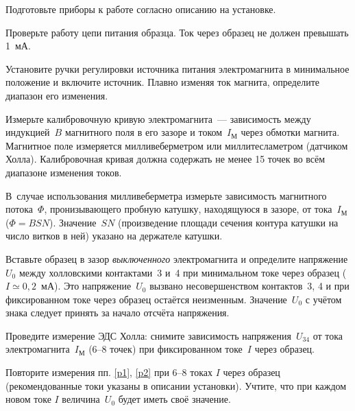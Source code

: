 \begin{lab:task}


\item Подготовьте приборы к работе согласно описанию на установке.

\item Проверьте работу цепи питания образца. Ток через образец не должен
превышать 1~мА.

\item Установите ручки регулировки источника питания электромагнита 
в минимальное положение и включите источник. 
Плавно изменяя ток магнита, определите диапазон его изменения.

\item Измерьте калибровочную кривую электромагнита~---
зависимость между индукцией~$B$ магнитного поля в его зазоре и 
током~$I_{М}$ через обмотки магнита.
Магнитное поле измеряется милливеберметром или миллитесламетром
(датчиком Холла). Калибровочная кривая должна содержать не менее
15 точек во всём диапазоне изменения токов.

В~случае использования милливеберметра измерьте зависимость 
магнитного потока~$\Phi$, пронизывающего пробную катушку, 
находящуюся в зазоре, от тока~$I_{М}$ ($\Phi=BSN$). 
Значение~$SN$ (произведение площади сечения контура катушки на
число витков в ней) указано на держателе катушки.

\item \label{p1} Вставьте образец в зазор \emph{выключенного} электромагнита 
и определите напряжение $U_0$ между холловскими
контактами~3 и~4 при минимальном токе через образец ($I\simeq 0,2$~мА). Это
напряжение~$U_0$ вызвано несовершенством контактов~3, 4 и при фиксированном токе
через образец остаётся неизменным. Значение~$U_0$ с учётом знака следует принять
за начало отсчёта напряжения.

\item \label{p2} Проведите измерение ЭДС Холла: снимите зависимость напряжения~$U_{34}$ 
от тока электромагнита~$I_{М}$ (6--8 точек) при фиксированном токе~$I$ 
через образец.

\item Повторите измерения пп. \ref{p1}, \ref{p2} при 6--8 токах $I$ через образец
(рекомендованные токи указаны в описании установки).  
Учтите, что при каждом новом токе $I$ величина~$U_0$ будет иметь 
своё значение.


\end{lab:task}
